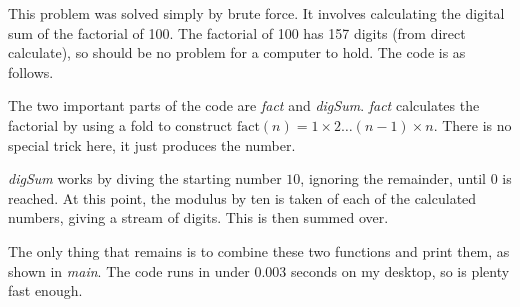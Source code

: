 This problem was solved simply by brute force. It involves calculating the digital sum of the factorial of 100. The factorial of 100 has 157 digits (from direct calculate), so should be no problem for a computer to hold. The code is as follows.



The two important parts of the code are \textit{fact} and \textit{digSum}. \textit{fact} calculates the factorial by using a fold to construct $\text{fact} (n) = 1 \times 2 \ldots (n-1) \times n$. There is no special trick here, it just produces the number.

\textit{digSum} works by diving the starting number $10$, ignoring the remainder, until $0$ is reached. At this point, the modulus by ten is taken of each of the calculated numbers, giving a stream of digits. This is then summed over.

The only thing that remains is to combine these two functions and print them, as shown in \textit{main}. The code runs in under 0.003 seconds on my desktop, so is plenty fast enough.

